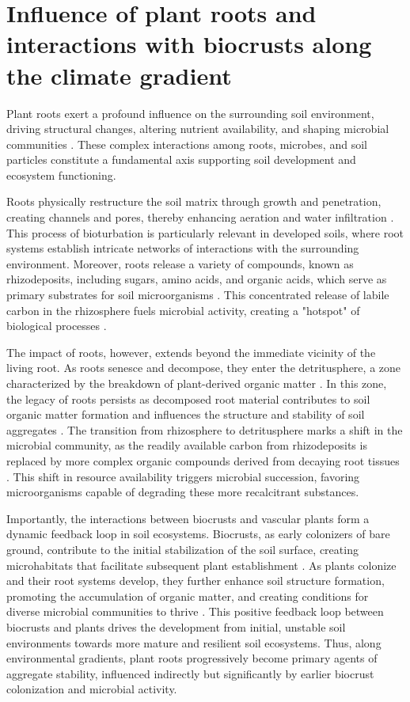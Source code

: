 \section{Influence of plant roots and interactions with biocrusts along the climate gradient}
\label{sec:PlantRootsBiocrust}

Plant roots exert a profound influence on the surrounding soil environment, driving structural changes, altering nutrient availability, and shaping microbial communities \citep{Hinsinger2009}. These complex interactions among roots, microbes, and soil particles constitute a fundamental axis supporting soil development and ecosystem functioning.

Roots physically restructure the soil matrix through growth and penetration, creating channels and pores, thereby enhancing aeration and water infiltration \citep{Bruand1996}. This process of bioturbation is particularly relevant in developed soils, where root systems establish intricate networks of interactions with the surrounding environment. Moreover, roots release a variety of compounds, known as rhizodeposits, including sugars, amino acids, and organic acids, which serve as primary substrates for soil microorganisms \citep{Hinsinger2009,Rasse2005}. This concentrated release of labile carbon in the rhizosphere fuels microbial activity, creating a "hotspot" of biological processes \citep{Hinsinger2009,Kuzyakov2015}.

The impact of roots, however, extends beyond the immediate vicinity of the living root. As roots senesce and decompose, they enter the detritusphere, a zone characterized by the breakdown of plant-derived organic matter \citep{Vidal2018}. In this zone, the legacy of roots persists as decomposed root material contributes to soil organic matter formation and influences the structure and stability of soil aggregates \citep{Six2004}. The transition from rhizosphere to detritusphere marks a shift in the microbial community, as the readily available carbon from rhizodeposits is replaced by more complex organic compounds derived from decaying root tissues \citep{Vidal2018}. This shift in resource availability triggers microbial succession, favoring microorganisms capable of degrading these more recalcitrant substances.

Importantly, the interactions between biocrusts and vascular plants form a dynamic feedback loop in soil ecosystems. Biocrusts, as early colonizers of bare ground, contribute to the initial stabilization of the soil surface, creating microhabitats that facilitate subsequent plant establishment \citep{BelnapBudel2016,Bowker2006}. As plants colonize and their root systems develop, they further enhance soil structure formation, promoting the accumulation of organic matter, and creating conditions for diverse microbial communities to thrive \citep{Schweizer2018,Six2004}. This positive feedback loop between biocrusts and plants drives the development from initial, unstable soil environments towards more mature and resilient soil ecosystems. Thus, along environmental gradients, plant roots progressively become primary agents of aggregate stability, influenced indirectly but significantly by earlier biocrust colonization and microbial activity.

